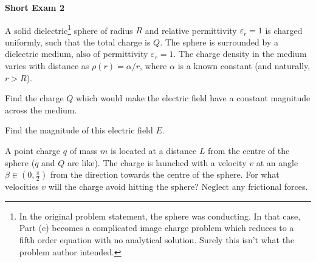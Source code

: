 \documentclass[../TST.tex]{subfiles}
\begin{document}
\begin{large}
	\textbf{Short Exam 2}
\end{large}

\begin{sproblem}
	A solid dielectric\footnote{In the original problem statement, the sphere was conducting. In that case, Part (c) becomes a complicated image charge problem which reduces to a fifth order equation with no analytical solution. Surely this isn't what the problem author intended.} sphere of radius $R$ and relative permittivity $\varepsilon_r=1$ is charged uniformly, such that the total charge is $Q$. The sphere is surrounded by a dielectric medium, also of permittivity $\varepsilon_r=1$. The charge density in the medium varies with distance as $\rho(r)=\alpha/r$, where $\alpha$ is a known constant (and naturally, $r>R$). 
\begin{subpart}
	\item Find the charge $Q$ which would make the electric field have a constant magnitude across the medium.  
	\item Find the magnitude of this electric field $E$. 
	\item A point charge $q$ of mass $m$ is located at a distance $L$ from the centre of the sphere ($q$ and $Q$ are like). The charge is launched with a velocity $v$ at an angle $\beta\in(0,\frac{\pi}{2})$ from the direction towards the centre of the sphere. For what velocities $v$ will the charge avoid hitting the sphere? Neglect any frictional forces. 
\end{subpart}
\end{sproblem}
\end{document}
